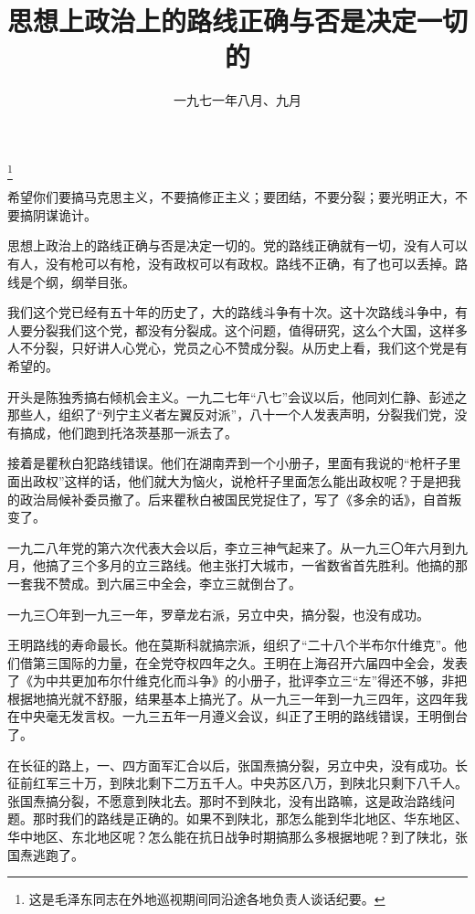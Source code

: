 
\title{思想上政治上的路线正确与否是决定一切的}
\date{一九七一年八月、九月}
\thanks{这是毛泽东同志在外地巡视期间同沿途各地负责人谈话纪要。}
\maketitle


希望你们要搞马克思主义，不要搞修正主义；要团结，不要分裂；要光明正大，不要搞阴谋诡计。

思想上政治上的路线正确与否是决定一切的。党的路线正确就有一切，没有人可以有人，没有枪可以有枪，没有政权可以有政权。路线不正确，有了也可以丢掉。路线是个纲，纲举目张。

我们这个党已经有五十年的历史了，大的路线斗争有十次。这十次路线斗争中，有人要分裂我们这个党，都没有分裂成。这个问题，值得研究，这么个大国，这样多人不分裂，只好讲人心党心，党员之心不赞成分裂。从历史上看，我们这个党是有希望的。

开头是陈独秀搞右倾机会主义。一九二七年“八七”会议以后，他同刘仁静、彭述之那些人，组织了“列宁主义者左翼反对派”，八十一个人发表声明，分裂我们党，没有搞成，他们跑到托洛茨基那一派去了。

接着是瞿秋白犯路线错误。他们在湖南弄到一个小册子，里面有我说的“枪杆子里面出政权”这样的话，他们就大为恼火，说枪杆子里面怎么能出政权呢？于是把我的政治局候补委员撤了。后来瞿秋白被国民党捉住了，写了《多余的话》，自首叛变了。

一九二八年党的第六次代表大会以后，李立三神气起来了。从一九三〇年六月到九月，他搞了三个多月的立三路线。他主张打大城市，一省数省首先胜利。他搞的那一套我不赞成。到六届三中全会，李立三就倒台了。

一九三〇年到一九三一年，罗章龙右派，另立中央，搞分裂，也没有成功。

王明路线的寿命最长。他在莫斯科就搞宗派，组织了“二十八个半布尔什维克”。他们借第三国际的力量，在全党夺权四年之久。王明在上海召开六届四中全会，发表了《为中共更加布尔什维克化而斗争》的小册子，批评李立三“左”得还不够，非把根据地搞光就不舒服，结果基本上搞光了。从一九三一年到一九三四年，这四年我在中央毫无发言权。一九三五年一月遵义会议，纠正了王明的路线错误，王明倒台了。

在长征的路上，一、四方面军汇合以后，张国焘搞分裂，另立中央，没有成功。长征前红军三十万，到陕北剩下二万五千人。中央苏区八万，到陕北只剩下八千人。张国焘搞分裂，不愿意到陕北去。那时不到陕北，没有出路嘛，这是政治路线问题。那时我们的路线是正确的。如果不到陕北，那怎么能到华北地区、华东地区、华中地区、东北地区呢？怎么能在抗日战争时期搞那么多根据地呢？到了陕北，张国焘逃跑了。

